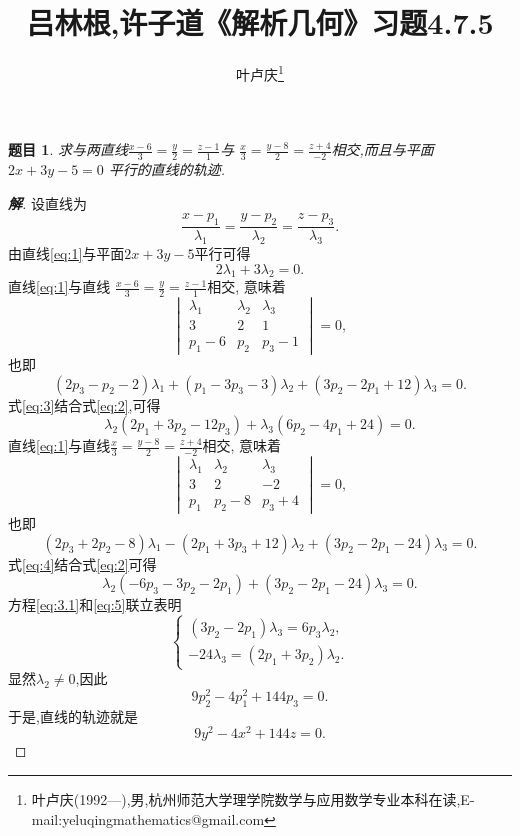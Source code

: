 \documentclass[a4paper]{article}
\newtheorem*{exe}{题目}
\newenvironment{exercise}
{\bigskip\begin{mdframed}\begin{exe}}
    {\end{exe}\end{mdframed}\bigskip}
\begin{document}
\title{\huge{\bf{吕林根,许子道《解析几何》习题4.7.5}}} \author{\small{叶卢庆\footnote{叶卢庆(1992---),男,杭州师范大学理学院数学与应用数学专业本科在读,E-mail:yeluqingmathematics@gmail.com}}}
\maketitle
\begin{exercise}
  求与两直线$\frac{x-6}{3}=\frac{y}{2}=\frac{z-1}{1}$与
  $\frac{x}{3}=\frac{y-8}{2}=\frac{z+4}{-2}$相交,而且与平面$2x+3y-5=0$
  平行的直线的轨迹.
\end{exercise}
\begin{proof}[\textbf{解}]
设直线为
\begin{equation}\label{eq:1}
\frac{x-p_1}{\lambda_1}=\frac{y-p_2}{\lambda_2}=\frac{z-p_3}{\lambda_3}.
\end{equation}
由直线\eqref{eq:1}与平面$2x+3y-5$平行可得
\begin{equation}
  \label{eq:2}
  2\lambda_1+3\lambda_2=0.
\end{equation}
直线\eqref{eq:1}与直线 $\frac{x-6}{3}=\frac{y}{2}=\frac{z-1}{1}$相交,
意味着
$$
\begin{vmatrix}
  \lambda_1&\lambda_2&\lambda_3\\
3&2&1\\
p_1-6&p_2&p_3-1
\end{vmatrix}=0,
$$
也即
\begin{equation}
  \label{eq:3}
  (2p_3-p_2-2)\lambda_1+(p_1-3p_3-3)\lambda_2+(3p_2-2p_1+12)\lambda_3=0.
\end{equation}
式\eqref{eq:3}结合式\eqref{eq:2},可得
\begin{equation}
  \label{eq:3.1}
 \lambda_2(2p_1+3p_2-12p_3)+\lambda_3(6p_2-4p_1+24)=0.
\end{equation}
直线\eqref{eq:1}与直线$\frac{x}{3}=\frac{y-8}{2}=\frac{z+4}{-2}$相交,
意味着
$$
\begin{vmatrix}
  \lambda_1&\lambda_2&\lambda_3\\
3&2&-2\\
p_1&p_2-8&p_3+4
\end{vmatrix}=0,
$$
也即
\begin{equation}
  \label{eq:4}
  (2p_3+2p_2-8)\lambda_1-(2p_1+3p_3+12)\lambda_2+(3p_2-2p_1-24)\lambda_3=0.
\end{equation}
式\eqref{eq:4}结合式\eqref{eq:2}可得
\begin{equation}
  \label{eq:5}
  \lambda_2(-6p_3-3p_2-2p_1)+(3p_2-2p_1-24)\lambda_3=0.
\end{equation}
方程\eqref{eq:3.1}和\eqref{eq:5}联立表明
$$
\begin{cases}
  (3p_2-2p_1)\lambda_3=6p_3\lambda_2,\\
-24\lambda_3=(2p_1+3p_2)\lambda_2.
\end{cases}
$$
显然$\lambda_2\neq 0$,因此
\begin{equation}
  \label{eq:6}
  9p_2^2-4p_1^2+144p_3=0.
\end{equation}
于是,直线的轨迹就是
$$
9y^2-4x^2+144z=0.
$$
\end{proof}
\end{document}

